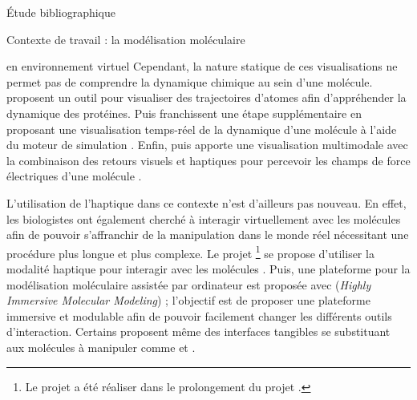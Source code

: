 \documentclass[myfrancais,ngerman,english,frenchb]{mythesis}
\begin{document}
\begin{mychapter}{Étude bibliographique}
\begin{mysection}{Contexte de travail : la modélisation moléculaire}
\begin{mysubsection}{ en environnement virtuel}
				Cependant, la nature statique de ces visualisations ne permet pas de comprendre la dynamique chimique au sein d'une molécule.
				 proposent un outil pour visualiser des trajectoires d'atomes afin d'appréhender la dynamique des protéines.
				Puis  franchissent une étape supplémentaire en proposant une visualisation temps-réel de la dynamique d'une molécule à l'aide du moteur de simulation \myGromacs {}.
				Enfin,  puis  apporte une visualisation multimodale avec la combinaison des retours visuels et haptiques pour percevoir les champs de force électriques d'une molécule .

				\begin{myfigure}
				\end{myfigure}

				L'utilisation de l'haptique dans ce contexte n'est d'ailleurs pas nouveau.
				En effet, les biologistes ont également cherché à interagir virtuellement avec les molécules afin de pouvoir s'affranchir de la manipulation dans le monde réel nécessitant une procédure plus longue et plus complexe.
				Le projet \myGROPEHaptic\footnote{Le projet \myGROPEHaptic a été réaliser dans le prolongement du projet \myGROPE.} se propose d'utiliser la modalité haptique pour interagir avec les molécules .
				Puis, une plateforme pour la modélisation moléculaire assistée par ordinateur est proposée avec \myHIMM (\textit{Highly Immersive Molecular Modeling}) ; l'objectif est de proposer une plateforme immersive et modulable afin de pouvoir facilement changer les différents outils d'interaction.
				Certains proposent même des interfaces tangibles se substituant aux molécules à manipuler comme  et .


\end{mysubsection}
\end{mysection}
\end{mychapter}
\end{document}
